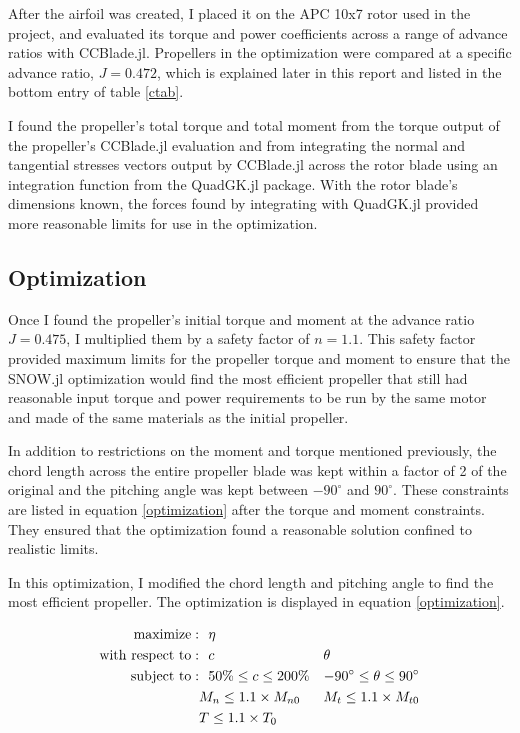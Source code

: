 \documentclass[journal ]{new-aiaa}
\newcounter{ctab}
\begin{document}
After the airfoil was created, I placed it on the APC 10x7 rotor used in the project, and evaluated its torque and power coefficients across a range of advance ratios with CCBlade.jl. Propellers in the optimization were compared at a specific advance ratio, $J=0.472$, which is explained later in this report and listed in the bottom entry of table \eqref{ctab}. 

I found the propeller's total torque and total moment from the torque output of the propeller's CCBlade.jl evaluation and from integrating the normal and tangential stresses vectors output by CCBlade.jl across the rotor blade using an integration function from the QuadGK.jl package. With the rotor blade's dimensions known, the forces found by integrating with QuadGK.jl provided more reasonable limits for use in the optimization.

\subsection{Optimization}

Once I found the propeller's initial torque and moment at the advance ratio $J=0.475$, I multiplied them by a safety factor of $n=1.1$. This safety factor provided maximum limits for the propeller torque and moment to ensure that the SNOW.jl optimization would find the most efficient propeller that still had reasonable input torque and power requirements to be run by the same motor and made of the same materials as the initial propeller.

In addition to restrictions on the moment and torque mentioned previously, the chord length across the entire propeller blade was kept within a factor of 2 of the original and the pitching angle was kept between $-90^{\circ}$ and $90^{\circ}$. These constraints are listed in equation \eqref{optimization} after the torque and moment constraints. They ensured that the optimization found a reasonable solution confined to realistic limits.

In this optimization, I modified the chord length and pitching angle to find the most efficient propeller. The optimization is displayed in equation \eqref{optimization}. 

\begin{equation}
	\begin{aligned}
		\mathrm{maximize:}& ~~ \eta \\
		\mathrm{with~respect~to:}& ~~ c & \multicolumn{1}{l}{$\theta$} \\
		\mathrm{subject~to:}& ~~ 50\% \leq c \leq 200\% & -90^{\circ} \leq \theta \leq 90^{\circ} \\
		& M_{n} \leq 1.1 \times M_{n0} & M_{t} \leq 1.1 \times M_{t0} \\
		& T \leq 1.1 \times T_{0} \\
	\end{aligned}
	\label{optimization}
\end{equation}
\end{document}
